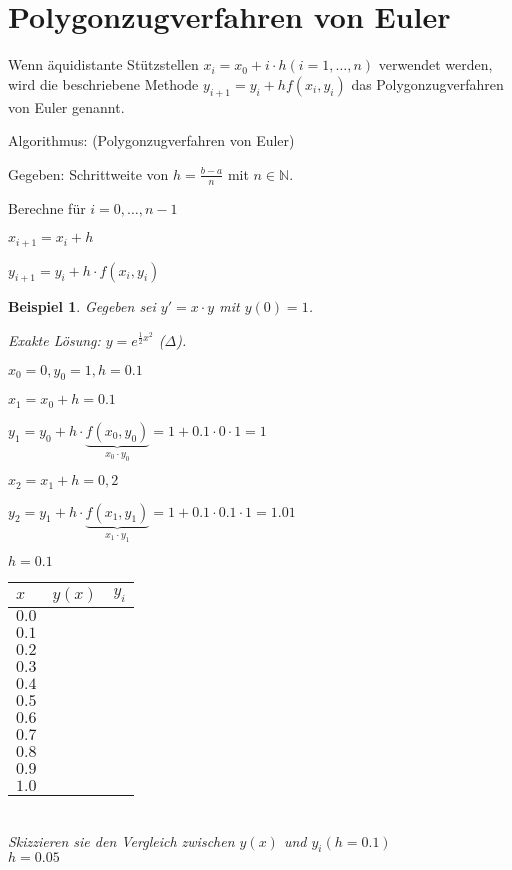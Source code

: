 \documentclass[fontset=ubuntu,12pt,a4paper]{scrreprt}
\newtheorem{beispiel}[defi]{Beispiel}
\begin{document}
\section{Polygonzugverfahren von Euler}

Wenn äquidistante Stützstellen \(x_i=x_0+i\cdot h (i=1,\dots,n)\) verwendet werden, wird die beschriebene Methode \(y_{i+1}=y_i+hf(x_i,y_i)\) das Polygonzugverfahren von Euler genannt.

Algorithmus: (Polygonzugverfahren von Euler)

Gegeben: Schrittweite von \(h=\frac{b-a}{n}\) mit \(n\in\mathbb{N}\).

Berechne für \(i=0,\dots,n-1\)

\(x_{i+1}=x_i+h\)

\(y_{i+1}=y_i+h\cdot f(x_i,y_i)\)

\begin{beispiel}
    Gegeben sei \(y'=x\cdot y\) mit \(y(0)=1\).
    
    Exakte Lösung: \(y=e^{\frac{1}{2}x^2}\) (\(\Delta\)).

    \(x_0=0,y_0=1,h=0.1\)

    \(x_1=x_0+h=0.1\)
    
    \(y_1=y_0+h\cdot \underbrace{f(x_0,y_0)}_{x_0\cdot y_0}=1+0.1\cdot 0\cdot 1 = 1\)

    \(x_2=x_1+h=0,2\)
    
    \(y_2=y_1+h\cdot \underbrace{f(x_1,y_1)}_{x_1\cdot y_1}=1+0.1\cdot 0.1\cdot 1 = 1.01\)
    
    \(h=0.1\)

    \begin{tabular}{| l | l | l |}
        \(x\) & \(y(x)\) & \(y_i\) \\
        \hline
        \(0.0\) & & \\
        \hline
        \(0.1\) & & \\
        \hline
        \(0.2\) & & \\
        \hline
        \(0.3\) & & \\
        \hline
        \(0.4\) & & \\
        \hline
        \(0.5\) & & \\
        \hline
        \(0.6\) & & \\
        \hline
        \(0.7\) & & \\
        \hline
        \(0.8\) & & \\
        \hline
        \(0.9\) & & \\
        \hline
        \(1.0\) & & \\
        \hline
    \end{tabular} \\
Skizzieren sie den Vergleich zwischen \(y(x)\) und \(y_i (h=0.1)\) \\
\(h=0.05\)
\end{beispiel}
\end{document}
